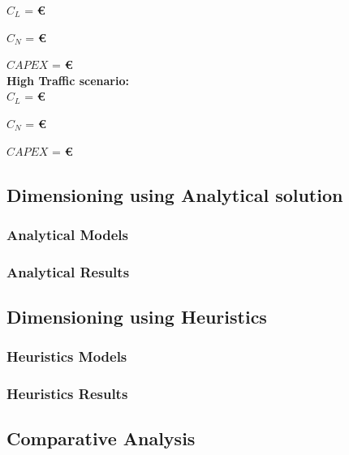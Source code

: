 $C_L$ = \textbf{\euro}

$C_N$ = \textbf{\euro}

$CAPEX$ = \textbf{\euro}\\

\textbf{High Traffic scenario:}\\

$C_L$ = \textbf{\euro}

$C_N$ = \textbf{ \euro}

$CAPEX$ =  \textbf{ \euro}\\

\subsection{Dimensioning using Analytical solution}

\subsubsection{Analytical Models}

\subsubsection{Analytical Results}

\newpage

\subsection{Dimensioning using Heuristics}

\subsubsection{Heuristics Models}

\subsubsection{Heuristics Results}

\subsection{Comparative Analysis}
